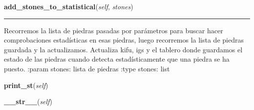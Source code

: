     \label{src:goban:Goban:add_stones_to_statistical}

    \vspace{0.5ex}

\hspace{.8\funcindent}\begin{boxedminipage}{\funcwidth}

    \raggedright \textbf{add\_stones\_to\_statistical}(\textit{self}, \textit{stones})

    \vspace{-1.5ex}

    \rule{\textwidth}{0.5\fboxrule}
\setlength{\parskip}{2ex}

Recorremos la lista de piedras pasadas por parámetros para buscar
hacer comprobaciones estadísticas en esas piedras, luego recorremos la
lista de piedras guardada y la actualizamos. Actualiza kifu, igs y el
tablero donde guardamos el estado de las piedras cuando detecta
estadísticamente que una piedra se ha puesto.
:param stones: lista de piedras
:type stones: list
\setlength{\parskip}{1ex}
    \end{boxedminipage}

    \label{src:goban:Goban:print_st}

    \vspace{0.5ex}

\hspace{.8\funcindent}\begin{boxedminipage}{\funcwidth}

    \raggedright \textbf{print\_st}(\textit{self})

\setlength{\parskip}{2ex}
\setlength{\parskip}{1ex}
    \end{boxedminipage}

    \label{src:goban:Goban:__str__}

    \vspace{0.5ex}

\hspace{.8\funcindent}\begin{boxedminipage}{\funcwidth}

    \raggedright \textbf{\_\_str\_\_}(\textit{self})

\setlength{\parskip}{2ex}
\setlength{\parskip}{1ex}
    \end{boxedminipage}


